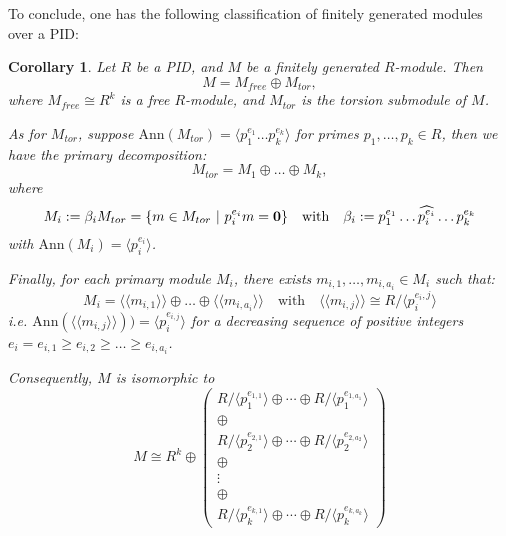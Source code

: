 \documentclass[11pt,openany]{book}
\theoremstyle{plain}
\newtheorem{corollary}[corollary]{Corollary}
\theoremstyle{definition}
\theoremstyle{remark}
\begin{document}
To conclude, one has the following classification of finitely generated modules over a PID: 
\begin{corollary} \label{cor-fgpid}
    Let $R$ be a PID, and $M$ be a finitely generated $R$-module. Then
    $$M = M_{free} \oplus M_{tor},$$ 
    where $M_{free} \cong R^k$ is a free $R$-module, and $M_{tor}$ is the torsion submodule of $M$.

\bigskip
    As for $M_{tor}$, suppose $\mathrm{Ann}(M_{tor}) = \langle p_1^{e_1} \dots p_k^{e_k} \rangle$ for primes $p_1, \dots, p_k \in R$, then we have the primary decomposition:
    $$M_{tor} = M_1 \oplus \dots \oplus M_k,$$
        where
        $$M_i := \beta_iM_{tor} = \{m \in M_{tor}\ |\ p_i^{e_i}m = {\bf 0}\} \quad \text{with} \quad \beta_i := p_1^{e_1} \dots \widehat{p_i^{e_i}} \dots p_k^{e_k}$$
        with $\mathrm{Ann}(M_i) = \langle p_i^{e_i} \rangle$.
        
\bigskip  
    Finally, for each primary module $M_i$, there exists $m_{i,1}, \dots, m_{i,a_i} \in M_i$ such that:
    $$M_i = \langle \langle m_{i,1} \rangle \rangle \oplus \dots \oplus \langle \langle m_{i,a_i} \rangle \rangle \quad \text{with} \quad \langle \langle m_{i,j} \rangle \rangle \cong R/\langle p_i^{e_i,j} \rangle$$
    i.e. $\mathrm{Ann}( \langle \langle m_{i,j} \rangle \rangle)) = \langle p_i^{e_{i,j}} \rangle$ for a decreasing sequence of positive integers $e_i = e_{i,1} \geq e_{i,2} \geq \dots \geq e_{i,a_i}$.

\bigskip
Consequently, $M$ is isomorphic to
$$M \cong R^k \oplus \begin{pmatrix} R/\langle p_1^{e_{1,1}} \rangle \oplus \cdots \oplus R/\langle p_1^{e_{1,a_1}} \rangle\\ 
\oplus \\
R/\langle p_2^{e_{2,1}} \rangle \oplus \cdots \oplus R/\langle p_2^{e_{2,a_2}} \rangle\\
\oplus \\
\vdots \\
\oplus \\
R/\langle p_k^{e_{k,1}} \rangle \oplus \cdots \oplus R/\langle p_k^{e_{k,a_k}} \rangle \end{pmatrix}$$
\end{corollary}
\end{document}
